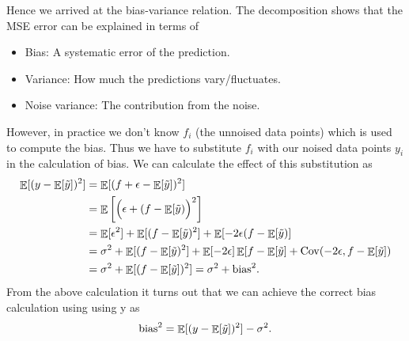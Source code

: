 \documentclass[norsk,a4paper,12pt]{scrartcl}
\DeclareMathOperator*{\E}{\mathbb{E}}
\begin{document}
Hence we arrived at the bias-variance relation. The decomposition shows that the MSE error can be explained in terms of 
\begin{itemize}
    \item Bias: A systematic error of the prediction.
    \item Variance: How much the predictions vary/fluctuates.
    \item Noise variance: The contribution from the noise.
\end{itemize}
However, in practice we don't know $f_i$ (the unnoised data points) which is used to compute the bias. Thus we have to substitute $f_i$ with our noised data points $y_i$ in the calculation of bias. We can calculate the effect of this substitution as
\begin{align*}
    \E[(y-\E[\Tilde{y}])^2]  &=  \E[(f + \epsilon -\E[\Tilde{y}])^2] \\
    &= \E\left[\Big(\epsilon + (f  -\E[\Tilde{y})\Big)^2\right] \\
    &= \E[\epsilon^2] + \E[(f  -\E[\Tilde{y})^2] + \E[-2\epsilon(f  -\E[\Tilde{y})] \\
    &= \sigma^2 + \E[(f  -\E[\Tilde{y})^2] + \E[-2\epsilon]\E[f  -\E[\Tilde{y}] +  \mathrm{Cov}(-2\epsilon, f  -\E[\Tilde{y}]) \\
    &= \sigma^2 +  \E[(f  -\E[\Tilde{y}])^2] = \sigma^2 + \text{bias}^2.
\end{align*}
From the above calculation it turns out that we can achieve the correct bias calculation using using y as
\begin{align*}
    \text{bias}^2 = \E[(y  -\E[\Tilde{y}])^2] - \sigma^2.
\end{align*}
\end{document}

